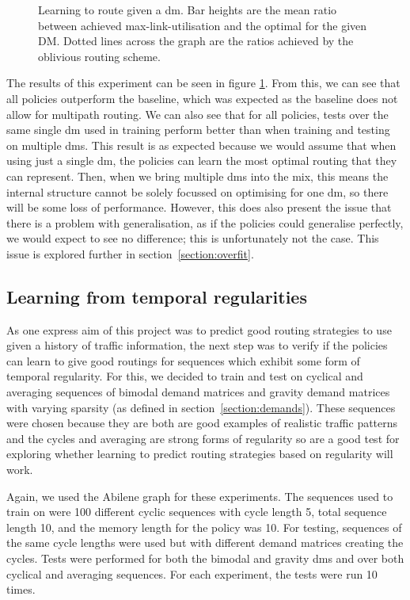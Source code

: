 \begin{figure}
    \centering
    \resizebox{\textwidth}{!}{}
    \caption{Learning to route given a \ac{dm}. Bar heights are the mean ratio between achieved max-link-utilisation and the optimal for the given DM. Dotted lines across the graph are the ratios achieved by the oblivious routing scheme.}
    \label{fig:exp_static}
\end{figure}

The results of this experiment can be seen in figure \ref{fig:exp_static}. From this, we can see that all policies outperform the baseline, which was expected as the baseline does not allow for multipath routing. We can also see that for all policies, tests over the same single \ac{dm} used in training perform better than when training and testing on multiple \acp{dm}. This result is as expected because we would assume that when using just a single \ac{dm}, the policies can learn the most optimal routing that they can represent. Then, when we bring multiple \acp{dm} into the mix, this means the internal structure cannot be solely focussed on optimising for one \ac{dm}, so there will be some loss of performance. However, this does also present the issue that there is a problem with generalisation, as if the policies could generalise perfectly, we would expect to see no difference; this is unfortunately not the case. This issue is explored further in section~\ref{section:overfit}.


\subsection{Learning from temporal regularities}
As one express aim of this project was to predict good routing strategies to use given a history of traffic information, the next step was to verify if the policies can learn to give good routings for sequences which exhibit some form of temporal regularity. For this, we decided to train and test on cyclical and averaging sequences of bimodal demand matrices and gravity demand matrices with varying sparsity (as defined in section~\ref{section:demands}). These sequences were chosen because they are both are good examples of realistic traffic patterns and the cycles and averaging are strong forms of regularity so are a good test for exploring whether learning to predict routing strategies based on regularity will work.

Again, we used the Abilene graph for these experiments. The sequences used to train on were 100 different cyclic sequences with cycle length 5, total sequence length 10, and the memory length for the policy was 10. For testing, sequences of the same cycle lengths were used but with different demand matrices creating the cycles. Tests were performed for both the bimodal and gravity \acp{dm} and over both cyclical and averaging sequences. For each experiment, the tests were run 10 times.

